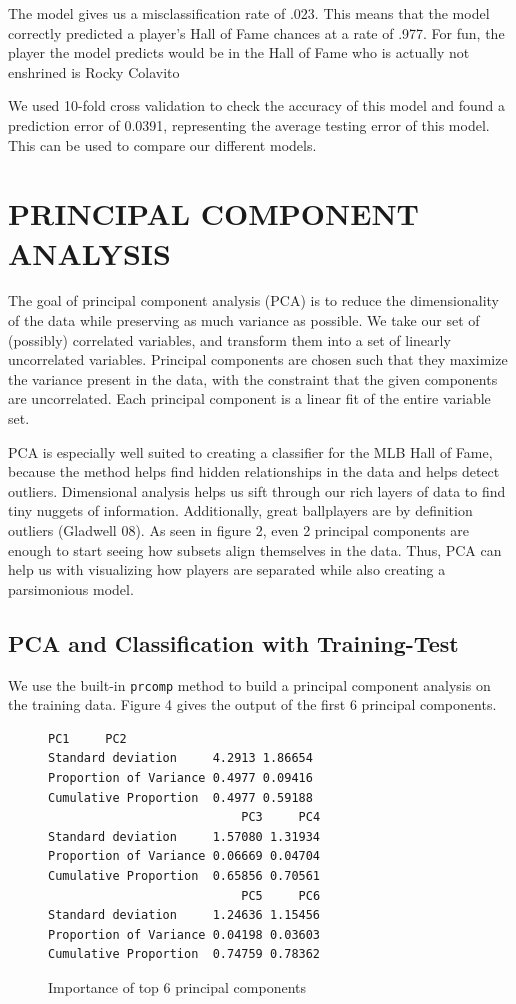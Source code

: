 \documentclass[letterpaper, 10 pt, conference]{ieeeconf}
\begin{document}
The model gives us a misclassification rate of .023. This means that the model correctly predicted a player's Hall of Fame chances at a rate of .977. For fun, the player the model predicts would be in the Hall of Fame who is actually not enshrined is Rocky Colavito

We used 10-fold cross validation to check the accuracy of this model and found a prediction error of 0.0391, representing the average testing error of this model. This can be used to compare our different models.

\section{PRINCIPAL COMPONENT ANALYSIS}
The goal of principal component analysis (PCA) is to reduce the dimensionality of the data while preserving as much variance as possible. We take our set of (possibly) correlated variables, and transform them into a set of linearly uncorrelated variables. Principal components are chosen such that they maximize the variance present in the data, with the constraint that the given components are uncorrelated. Each principal component is a linear fit of the entire variable set. 

PCA is especially well suited to creating a classifier for the MLB Hall of Fame, because the method helps find hidden relationships in the data and helps detect outliers. Dimensional analysis helps us sift through our rich layers of data to find tiny nuggets of information. Additionally, great ballplayers are by definition outliers (Gladwell 08). As seen in figure 2, even 2 principal components are enough to start seeing how subsets align themselves in the data. Thus, PCA can help us with visualizing how players are separated while also creating a parsimonious model. 
\subsection{PCA and Classification with Training-Test}
We use the built-in {{\tt\small prcomp}} method to build a principal component analysis on the training data.
Figure 4 gives the output of the first 6 principal components.
\begin{figure}[thpb]
\caption{Importance of top 6 principal components}
\begin{Verbatim}[frame=single]
                          PC1     PC2
Standard deviation     4.2913 1.86654
Proportion of Variance 0.4977 0.09416
Cumulative Proportion  0.4977 0.59188
                           PC3     PC4
Standard deviation     1.57080 1.31934
Proportion of Variance 0.06669 0.04704
Cumulative Proportion  0.65856 0.70561
                           PC5     PC6
Standard deviation     1.24636 1.15456
Proportion of Variance 0.04198 0.03603
Cumulative Proportion  0.74759 0.78362
\end{Verbatim}
\end{figure}
\end{document}

